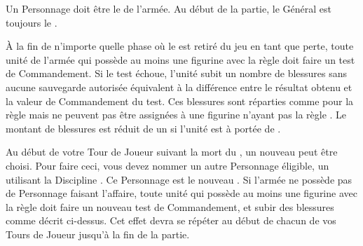 

\startarmywiderules

\armywideruleentry{\masterofundeath}

Un Personnage doit être le \textbf{\master{}} de l'armée. Au début de la partie, le Général est toujours le \master{}.


\endarmywiderules

\vspace*{1.5cm}
\startarmyspecialrules

\armyspecialruleentry{\ashestoashes}

À la fin de n'importe quelle phase où le \master{} est retiré du jeu en tant que perte, toute unité de l'armée qui possède au moins une figurine avec la règle \ashestoashes{} doit faire un test de Commandement. Si le test échoue, l'unité subit un nombre de blessures sans aucune sauvegarde autorisée équivalent à la différence entre le résultat obtenu et la valeur de Commandement du test. Ces blessures sont réparties comme pour la règle \unstable{} mais ne peuvent pas être assignées à une figurine n'ayant pas la règle \ashestoashes{}. Le montant de blessures est réduit de un si l'unité est à portée de \holdyourground{}.

Au début de votre Tour de Joueur suivant la mort du \master{}, un nouveau \master{} peut être choisi. Pour faire ceci, vous devez nommer un autre Personnage éligible, un \wizard{} utilisant la Discipline \necromancy{}. Ce Personnage est le nouveau \master{}. Si l'armée ne possède pas de Personnage faisant l'affaire, toute unité qui possède au moins une figurine avec la règle \ashestoashes{} doit faire un nouveau test de Commandement, et subir des blessures comme décrit ci-dessus. Cet effet devra se répéter au début de chacun de vos Tours de Joueur jusqu'à la fin de la partie.

\armyspecialruleentry{\newrule{\wailofwoe}}



